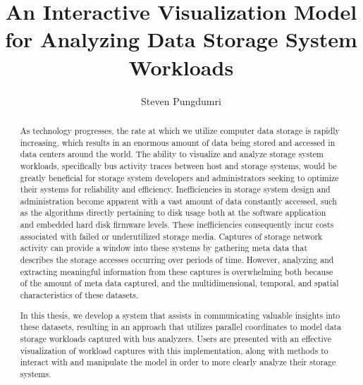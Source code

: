 \documentclass[12pt]{ucthesis}
\begin{document}

\title{An Interactive Visualization Model for Analyzing Data Storage System Workloads}
\author{Steven Pungdumri}
  
 
     



\maketitle

\begin{frontmatter}

\copyrightpage

\committeemembershippage

\begin{abstract} 

As technology progresses, the rate at which we utilize computer data storage is rapidly increasing, which results in an enormous amount of data being stored and accessed in data centers around the world. The ability to visualize and analyze storage system workloads, specifically bus activity traces between host and storage systems, would be greatly beneficial for storage system developers and administrators seeking to optimize their systems for reliability and efficiency. Inefficiencies in storage system design and administration become apparent with a vast amount of data constantly accessed, such as the algorithms directly pertaining to disk usage both at the software application and embedded hard disk firmware levels. These inefficiencies consequently incur costs associated with failed or underutilized storage media. Captures of storage network activity can provide a window into these systems by gathering meta data that describes the storage accesses occurring over periods of time. However, analyzing and extracting meaningful information from these captures is overwhelming both because of the amount of meta data captured, and the multidimensional, temporal, and spatial characteristics of these datasets.

In this thesis, we develop a system that assists in communicating valuable insights into these datasets, resulting in an approach that utilizes parallel coordinates to model data storage workloads captured with bus analyzers. Users are presented with an effective visualization of workload captures with this implementation, along with methods to interact with and manipulate the model in order to more clearly analyze their storage systems.


\end{abstract}
\end{frontmatter}
\end{document}
